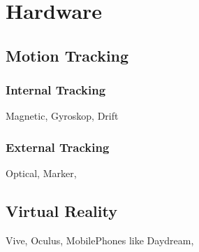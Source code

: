 \chapter{Hardware}

\section{Motion Tracking}
\subsection{Internal Tracking}
Magnetic, Gyroskop, Drift
\subsection{External Tracking}
Optical, Marker, 

\section{Virtual Reality}
Vive, Oculus, MobilePhones like Daydream, 
